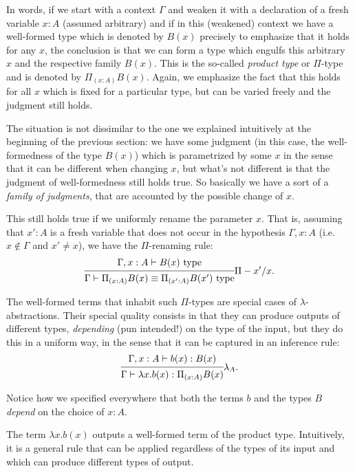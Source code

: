 In words, if we start with a context $ \Gamma $ and weaken it with
a declaration of a fresh variable $ x : A $ (assumed arbitrary)
and if in this (weakened) context we have a well-formed type
which is denoted by $ B(x) $ precisely to emphasize that it holds for
any $ x $, the conclusion is that we can form a type which engulfs
this arbitrary $ x $ and the respective family $ B(x) $. This is the
so-called \emph{product type} or $ \Pi $-type and is denoted by
$ \Pi_{(x : A)} B(x) $. Again, we emphasize the fact that this holds
for all $ x $ which is fixed for a particular type, but can be varied
freely and the judgment still holds.

The situation is not dissimilar to the one we explained intuitively at
the beginning of the previous section: we have some judgment (in this case,
the well-formedness of the type $ B(x) $) which is parametrized by
some $ x $ in the sense that it can be different when changing $ x $,
but what's not different is that the judgment of well-formedness
still holds true. So basically we have a sort of a \emph{family of %
  judgments}, that are accounted by the possible change of $ x $.

This still holds true if we uniformly rename the parameter $ x $.
That is, assuming that $ x' : A $ is a fresh variable that does not
occur in the hypothesis $ \Gamma, x : A $ (i.e.\ $ x \notin \Gamma $
and $ x' \neq x $), we have the $ \Pi $-renaming rule:
\[
  \begin{prooftree}
    \hypo{\Gamma, x : A \vdash B(x) \text{ type}}
    \infer1{\Gamma \vdash \Pi_{(x : A)} B(x) \equiv %
      \Pi_{(x' : A)} B(x') \text{ type}}
  \end{prooftree} \Pi-x'/x.
\]

The well-formed terms that inhabit such $ \Pi $-types are special cases
of $ \lambda $-abstractions. Their special quality consists in that they
can produce outputs of different types, \emph{depending} (pun intended!)
on the type of the input, but they do this in a uniform way, in the sense
that it can be captured in an inference rule:
\[
  \begin{prooftree}
    \hypo{\Gamma, x : A \vdash b(x) : B(x)}
    \infer1{\Gamma \vdash \lambda x.b(x) : \Pi_{(x : A)} B(x)}
  \end{prooftree} \lambda_A.
\]

Notice how we specified everywhere that both the terms $ b $ and the
types $ B $ \emph{depend} on the choice of $ x : A $.

The term $ \lambda x . b(x) $ outputs a well-formed term of the
product type. Intuitively, it is a general rule that can be applied
 regardless of the types of its input and which
can produce different types of output.

